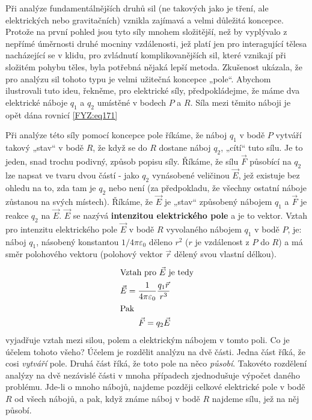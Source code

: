 {    Při analýze fundamentálnějších druhů sil (ne takových jako je tření, ale elektrických nebo 
    gravitačních) vznikla zajímavá a velmi důležitá koncepce. Protože na první pohled jsou tyto 
    síly mnohem složitější, než by vyplývalo z nepřímé úměrnosti druhé mocniny vzdálenosti, jež 
    platí jen pro interagující tělesa nacházející se v klidu, pro zvládnutí komplikovanějších sil, 
    které vznikají při složitém pohybu těles, byla potřebná nějaká lepší metoda. Zkušenost ukázala, 
    že pro analýzu sil tohoto typu je velmi užitečná koncepce „pole“. Abychom ilustrovali tuto 
    ideu, řekněme, pro elektrické síly, předpokládejme, že máme dva elektrické náboje \(q_1\) a 
    \(q_2\) umístěné v bodech \(P\) a \(R\). Síla mezi těmito náboji je opět dána rovnicí 
    \ref{FYZ:eq171}
    
    Při analýze této síly pomocí koncepce pole říkáme, že náboj \(q_1\) v bodě \(P\) vytváří takový 
    „stav“ v bodě \(R\), že když se do \(R\) dostane náboj \(q_2\), „cítí“ tuto sílu. Je to jeden, 
    snad trochu podivný, způsob popisu síly. Říkáme, že sílu \(\vec{F}\) působící na \(q_2\) lze 
    napsat ve tvaru dvou částí - jako \(q_2\) vynásobené veličinou \(\vec{E}\), jež existuje bez 
    ohledu na to, zda tam je \(q_2\) nebo není (za předpokladu, že všechny ostatní náboje zůstanou 
    na svých místech). Říkáme, že  \(\vec{E}\) je „stav“ způsobený nábojem \(q_1\) a \(\vec{F}\) je 
    reakce \(q_2\) na \(\vec{E}\). \(\vec{E}\) se nazývá \textbf{intenzitou elektrického pole} a je 
    to vektor. Vztah pro intenzitu elektrického pole \(\vec{E}\) v bodě \(R\) vyvolaného nábojem 
    \(q_1\) v bodě \(P\), je: náboj \(q_1\), násobený konstantou \(1/4\pi\varepsilon_0\) děleno 
    \(r^2\) (\(r\) je vzdálenost z \(P\) do \(R\)) a má směr polohového vektoru (polohový vektor 
    \(\vec{r}\) dělený svou vlastní délkou).
    \begin{align}
      \shortintertext{Vztah pro \(\vec{E}\) je tedy}
      \vec{E} = \frac{1}{4\pi\varepsilon_0}\frac{q_1\vec{r}}{r^3}   \label{FYZ:eq172} \\
      \shortintertext{Pak}
      \vec{F} = q_2\vec{E}                                          \label{FYZ:eq173}
    \end{align}
    vyjadřuje vztah mezi silou, polem a elektrickým nábojem v tomto poli. Co je účelem tohoto 
    všeho? Účelem je rozdělit analýzu na dvě části. Jedna část říká, že cosi \emph{vytváří} pole. 
    Druhá část říká, že toto pole na něco \emph{působí}. Takovéto rozdělení analýzy na dvě 
    nezávislé části v mnoha případech zjednodušuje výpočet daného problému. Jde-li o mnoho nábojů, 
    najdeme později celkové elektrické pole v bodě \(R\) od všech nábojů, a pak, když známe náboj v 
    bodě \(R\) najdeme sílu, jež na něj působí.
    
}
